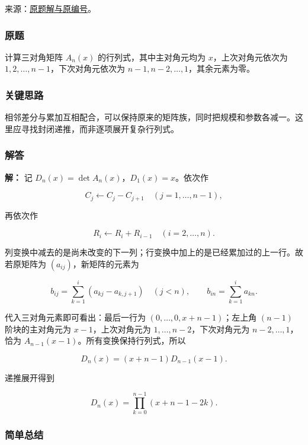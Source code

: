 \documentclass[11pt,a4paper]{article}
\begin{document}
来源：\href{https://zj139.github.io/math-notes/essays/52bc0e24478b1b81c7ab09fc/\#问题-2018a04}{原题解与原编号}。

\subsubsection{原题}\label{ux539fux9898-30}

计算三对角矩阵 \(A_n(x)\) 的行列式，其中主对角元均为
\(x\)，上次对角元依次为 \(1,2,\ldots,n-1\)，下次对角元依次为
\(n-1,n-2,\ldots,1\)，其余元素为零。

\subsubsection{关键思路}\label{ux5173ux952eux601dux8def-30}

相邻差分与累加互相配合，可以保持原来的矩阵族，同时把规模和参数各减一。这里应寻找封闭递推，而非逐项展开复杂行列式。

\subsubsection{解答}\label{ux89e3ux7b54-30}

\textbf{解：} 记 \(D_n(x)=\det A_n(x)\)，\(D_1(x)=x\)。依次作

\[
C_j\leftarrow C_j-C_{j+1}\quad(j=1,\ldots,n-1),
\]

再依次作

\[
R_i\leftarrow R_i+R_{i-1}\quad(i=2,\ldots,n).
\]

列变换中减去的是尚未改变的下一列；行变换中加上的是已经累加过的上一行。故若原矩阵为
\((a_{ij})\)，新矩阵的元素为

\[
b_{ij}=\sum_{k=1}^i(a_{kj}-a_{k,j+1})\quad(j<n),
\qquad b_{in}=\sum_{k=1}^ia_{kn}.
\]

代入三对角元素即可看出：最后一行为 \((0,\ldots,0,x+n-1)\)；左上角
\((n-1)\) 阶块的主对角元为 \(x-1\)，上次对角元为
\(1,\ldots,n-2\)，下次对角元为 \(n-2,\ldots,1\)，恰为
\(A_{n-1}(x-1)\)。所有变换保持行列式，所以

\[
D_n(x)=(x+n-1)D_{n-1}(x-1).
\]

递推展开得到

\[
D_n(x)=\prod_{k=0}^{n-1}(x+n-1-2k).
\]

\subsubsection{简单总结}\label{ux7b80ux5355ux603bux7ed3-30}
\end{document}
